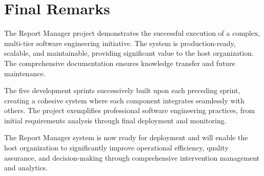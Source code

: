 \section*{Final Remarks}

The Report Manager project demonstrates the successful execution of a complex, multi-tier software engineering initiative. The system is production-ready, scalable, and maintainable, providing significant value to the host organization. The comprehensive documentation ensures knowledge transfer and future maintenance.

The five development sprints successively built upon each preceding sprint, creating a cohesive system where each component integrates seamlessly with others. The project exemplifies professional software engineering practices, from initial requirements analysis through final deployment and monitoring.

The Report Manager system is now ready for deployment and will enable the host organization to significantly improve operational efficiency, quality assurance, and decision-making through comprehensive intervention management and analytics.
